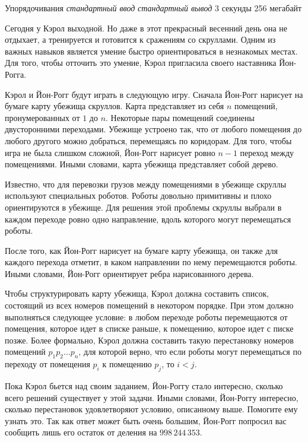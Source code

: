 \begin{problem}%
{Упорядочивания}%
{\textsl{стандартный ввод}}%
{\textsl{стандартный вывод}}%
{3 секунды}%
{256 мегабайт}{}

Сегодня у Кэрол выходной. Но даже в этот прекрасный весенний день она не отдыхает, а тренируется и готовится к сражениям со скруллами. Одним из важных навыков является умение быстро ориентироваться в незнакомых местах. Для того, чтобы отточить это умение, Кэрол пригласила своего наставника Йон-Рогга.

Кэрол и Йон-Рогг будут играть в следующую игру. Сначала Йон-Рогг нарисует на бумаге карту убежища скруллов. Карта представляет из себя $n$ помещений, пронумерованных от $1$ до $n$. Некоторые пары помещений соединены двусторонними переходами. Убежище устроено так, что от любого помещения до любого другого можно добраться, перемещаясь по коридорам. Для того, чтобы игра не была слишком сложной, Йон-Рогг нарисует ровно $n - 1$ переход между помещениями. Иными словами, карта убежища представляет собой дерево.

Известно, что для перевозки грузов между помещениями в убежище скруллы используют специальных роботов. Роботы довольно примитивны и плохо ориентируются в убежище. Для решения этой проблемы скруллы выбрали в каждом переходе ровно одно направление, вдоль которого могут перемещаться роботы.

После того, как Йон-Рогг нарисует на бумаге карту убежища, он также для каждого перехода отметит, в каком направлении по нему перемещаются роботы. Иными словами, Йон-Рогг ориентирует ребра нарисованного дерева.

Чтобы структурировать карту убежища, Кэрол должна составить список, состоящий из всех номеров помещений в некотором порядке. При этом должно выполняться следующее условие: в любом переходе роботы перемещаются от помещения, которое идет в списке раньше, к помещению, которое идет с писке позже. Более формально, Кэрол должна составить такую перестановку номеров помещений $p_1 p_2 \ldots p_n$, для которой верно, что если роботы могут перемещаться по переходу от помещения $p_i$ к помещению $p_j$, то $i < j$.

Пока Кэрол бьется над своим заданием, Йон-Роггу стало интересно, сколько всего решений существует у этой задачи. Иными словами, Йон-Роггу интересно, сколько перестановок удовлетворяют условию, описанному выше. Помогите ему узнать это. Так как ответ может быть очень большим, Йон-Рогг попросил вас сообщить лишь его остаток от деления на $998\,244\,353$.


\end{problem}
